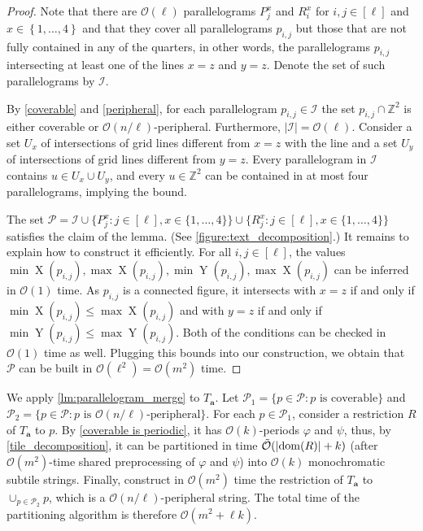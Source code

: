 \documentclass[a4paper,11pt]{article}
\let\Cref\cref
\newcommand{\Z}{\mathbb{Z}}
\renewcommand{\O}{\mathcal{O}}
\newcommand{\tO}{\tilde{\mathcal{O}}}
\newcommand{\I}{\mathcal{I}}
\newcommand{\Ta}{T_\mathbf{a}}
\renewcommand{\phi}{\varphi}
\newcommand{\set}[1]{\left\lbrace #1 \right\rbrace}
\DeclareMathOperator*{\X}{X}
\DeclareMathOperator*{\Y}{Y}
\newcommand{\absolute}[1]{\left\lvert#1\right\rvert}
\begin{document}
\begin{proof}
Note that there are $\O(\ell)$ parallelograms $P_j^x$ and $R_i^x$ for $i,j \in [\ell]$ and $x \in \set{1, \dots, 4}$ and that they cover all parallelograms $p_{i,j}$ but those that are not fully contained in any of the quarters, in other words, the parallelograms $p_{i, j}$ intersecting  at least one of the lines $x = z$ and $y = z$. Denote the set of such parallelograms by $\I$. 

By \cref{coverable} and \cref{peripheral}, for each parallelogram $p_{i,j} \in \I$ the set $p_{i,j} \cap \Z^2$ is either coverable or $\O(n/\ell)$-peripheral. Furthermore, $\absolute{\I} = \O(\ell)$. Consider a set $U_x$ of intersections of grid lines different from $x=z$ with the line and a set $U_y$ of intersections of grid lines different from $y=z$. Every parallelogram in $\I$ contains $u \in U_x \cup U_y$, and every $u \in \Z^2$ can be contained in at most four parallelograms, implying the bound. 

The set $\mathcal{P} = \I \cup \{P_j^x : j \in [\ell], x \in \{1, \dots, 4\}\} \cup \{R_j^x : j \in [\ell], x \in \{1, \dots, 4\}\}$ satisfies the claim of the lemma. (See \cref{figure:text_decomposition}.) It remains to explain how to construct it efficiently. For all $i,j \in [\ell]$, the values $\min \X(p_{i,j}), \max \X(p_{i,j}), \min \Y(p_{i,j}), \max \X(p_{i,j})$ can be inferred in $\O(1)$ time. As $p_{i,j}$ is a connected figure, it intersects with $x = z$ if and only if $\min \X(p_{i,j}) \le \max \X(p_{i,j})$ and with $y = z$ if and only if $\min \Y(p_{i,j}) \le \max \Y(p_{i,j})$. Both of the conditions can be checked in $\O(1)$ time as well. Plugging this bounds into our construction, we obtain that $\mathcal{P}$ can be built in $\O(\ell^2) = \O(m^2)$ time. 
\end{proof}

We apply \cref{lm:parallelogram_merge} to $\Ta$. Let $\mathcal{P}_1 = \{p \in \mathcal{P} : p \text { is coverable}\}$ and $\mathcal{P}_2 = \{p \in \mathcal{P} : p \text { is }\O(n/\ell)\text{-peripheral}\}$. For each $p \in \mathcal{P}_1$, consider a restriction $R$ of $\Ta$ to $p$. By \Cref{coverable is periodic}, it has $\O(k)$-periods $\phi$ and $\psi$, thus, by \Cref{tile_decomposition}, it can be partitioned in time $\tO(\absolute{\d{R}} + k)$ (after $\O(m^2)$-time shared preprocessing of $\phi$ and $\psi$) into $\O(k)$ monochromatic subtile strings. Finally, construct in $\O(m^2)$ time the restriction of $\Ta$ to $\cup_{p \in \mathcal{P}_2} p$, which is a $\O(n / \ell)$-peripheral string. The total time of the partitioning algorithm is therefore $\O(m^2+\ell k)$.
\end{document}
